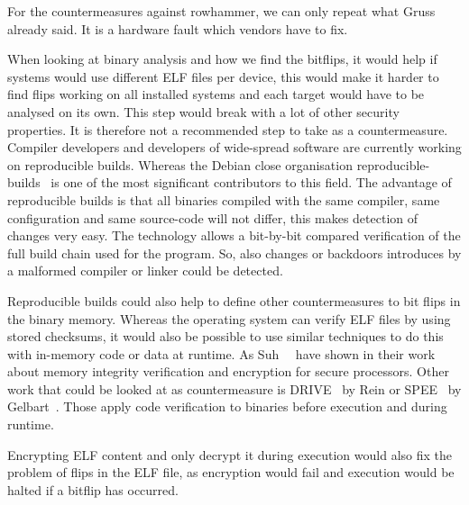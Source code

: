 For the countermeasures against rowhammer, we can only repeat what
Gruss~\etal~\cite{nethammer, flipinthewall} already said. It is a hardware fault
which vendors have to fix.

When looking at binary analysis and how we find the bitflips, it would help if
systems would use different ELF files per device, this would make it harder to
find flips working on all installed systems and each target would have to be
analysed on its own. This step would break with a lot of other security
properties. It is therefore not a recommended step to take as a countermeasure.
Compiler developers and developers of wide-spread software are currently working
on reproducible builds. Whereas the Debian close organisation
reproducible-builds~\cite{reprobuilds} is one of the most significant
contributors to this field. The advantage of reproducible builds is that all
binaries compiled with the same compiler, same configuration and same
source-code will not differ, this makes detection of changes very easy. The
technology allows a bit-by-bit compared verification of the full build chain
used for the program. So, also changes or backdoors introduces by a malformed
compiler or linker could be detected.

Reproducible builds could also help to define other countermeasures to bit flips
in the binary memory. Whereas the operating system can verify ELF files by using
stored checksums, it would also be possible to use similar techniques to do this
with in-memory code or data at runtime. As Suh~\etal~\cite{memintegrity} have
shown in their work about memory integrity verification and encryption for
secure processors. Other work that could be looked at as countermeasure is
DRIVE~\cite{drive} by Rein or SPEE~\cite{spee} by Gelbart~\etal. Those apply
code verification to binaries before execution and during runtime.

Encrypting ELF content and only decrypt it during execution would also fix the
problem of flips in the ELF file, as encryption would fail and execution would
be halted if a bitflip has occurred.

